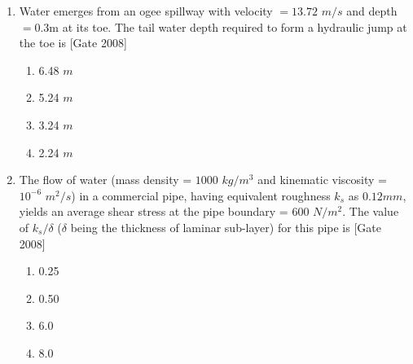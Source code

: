 \documentclass[journal]{IEEEtran}
\begin{document}
\begin{enumerate}
	\item Water emerges from an ogee spillway with velocity $= 13.72$ $m/s$ and depth $= 0.3$m at its toe. The tail water depth required to form a hydraulic jump at the toe is  \hfill [Gate 2008]
\begin{multicols}{4}
	\begin{enumerate}
		\item 6.48 $m$
		\item 5.24 $m$
		\item 3.24 $m$
		\item 2.24 $m$
	\end{enumerate}
\end{multicols}
	\item The flow of water (mass density = $1000$ $kg/m^3$ and kinematic viscosity = $10^{-6}$ $m^2/s$) in a commercial pipe, having equivalent roughness $k_s$ as $0.12mm$, yields an average shear stress at the pipe boundary = $600$ $N/m^2$. The value of $k_s / \delta$ ($\delta$ being the thickness of laminar sub-layer) for this pipe is  \hfill [Gate 2008]
		\begin{multicols}{4}
	\begin{enumerate}
		\item 0.25
		\item 0.50
		\item 6.0
		\item 8.0
	\end{enumerate}
\end{multicols}


\end{enumerate}
\end{document}
